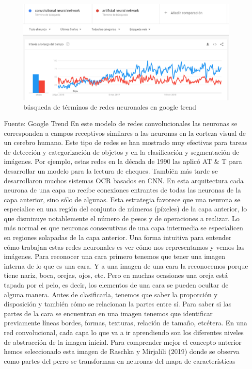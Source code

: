 \documentclass[
  a4paper,
  DIV=11,
  numbers=noendperiod]{scrreprt}
\begin{document}
\begin{figure}

{\centering \includegraphics{imagenes/capitulo1/busqueda_google.png}

}

\caption{\label{fig-busqueda-google}búsqueda de términos de redes
neuronales en google trend}

\end{figure}

Fuente: Google Trend En este modelo de redes convolucionales las
neuronas se corresponden a campos receptivos similares a las neuronas en
la corteza visual de un cerebro humano. Este tipo de redes se han
mostrado muy efectivas para tareas de detección y categorización de
objetos y en la clasificación y segmentación de imágenes. Por ejemplo,
estas redes en la década de 1990 las aplicó AT \& T para desarrollar un
modelo para la lectura de cheques. También más tarde se desarrollaron
muchos sistemas OCR basados en CNN. En esta arquitectura cada neurona de
una capa no recibe conexiones entrantes de todas las neuronas de la capa
anterior, sino sólo de algunas. Esta estrategia favorece que una neurona
se especialice en una región del conjunto de números (píxeles) de la
capa anterior, lo que disminuye notablemente el número de pesos y de
operaciones a realizar. Lo más normal es que neuronas consecutivas de
una capa intermedia se especialicen en regiones solapadas de la capa
anterior. Una forma intuitiva para entender cómo trabajan estas redes
neuronales es ver cómo nos representamos y vemos las imágenes. Para
reconocer una cara primero tenemos que tener una imagen interna de lo
que es una cara. Y a una imagen de una cara la reconocemos porque tiene
nariz, boca, orejas, ojos, etc. Pero en muchas ocasiones una oreja está
tapada por el pelo, es decir, los elementos de una cara se pueden
ocultar de alguna manera. Antes de clasificarla, tenemos que saber la
proporción y disposición y también cómo se relacionan la partes entre
sí. Para saber si las partes de la cara se encuentran en una imagen
tenemos que identificar previamente líneas bordes, formas, texturas,
relación de tamaño, etcétera. En una red convolucional, cada capa lo que
va a ir aprendiendo son los diferentes niveles de abstracción de la
imagen inicial. Para comprender mejor el concepto anterior hemos
seleccionado esta imagen de Raschka y Mirjalili (2019) donde se observa
como partes del perro se transforman en neuronas del mapa de
características
\end{document}
